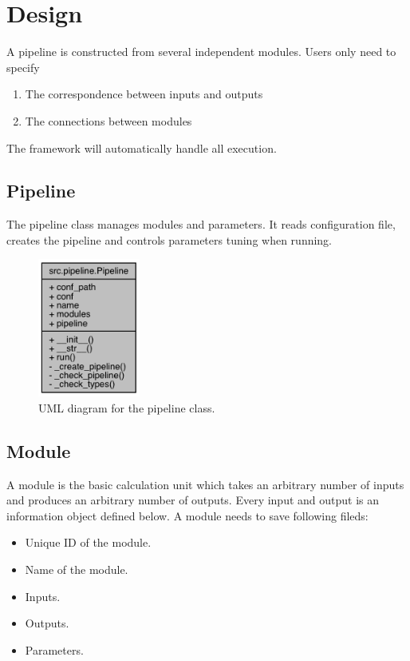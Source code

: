 \documentclass{article}
\begin{document}
\section{Design}
    A pipeline is constructed from several independent modules.
    Users only need to specify
    \begin{enumerate}
        \item The correspondence between inputs and outputs
        \item The connections between modules
    \end{enumerate}
    The framework will automatically handle all execution.

    \subsection{Pipeline}
    The pipeline class manages modules and parameters.
    It reads configuration file, creates the pipeline and controls parameters tuning when running.

    \begin{figure}[H]
        \begin{center}
            \includegraphics[width=0.3\textwidth]{fig/pipeline_uml.png}
        \end{center}
        \label{fig:pipeline_uml}
        \caption{UML diagram for the pipeline class.}
    \end{figure}

    \subsection{Module}
    A module is the basic calculation unit which takes an arbitrary number of inputs and produces an arbitrary number of outputs.
    Every input and output is an information object defined below.
    A module needs to save following fileds:
    \begin{itemize}
        \item Unique ID of the module.
        \item Name of the module.
        \item Inputs.
        \item Outputs.
        \item Parameters.
    \end{itemize}
\end{document}
